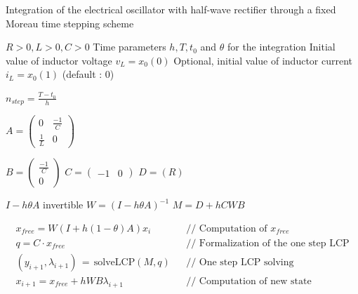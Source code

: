 \documentclass[10pt]{article}
\begin{document}
\begin{algorithm}
\caption{Integration of the electrical oscillator with half-wave rectifier through a fixed Moreau time stepping scheme}
\begin{algorithmic} 

\REQUIRE $R > 0 , L > 0 , C > 0$
\REQUIRE Time parameters $h,T,t_0$ and $\theta$ for the integration 
\REQUIRE Initial value of inductor voltage $v_L = x_0(0)$
\REQUIRE Optional, initial value  of inductor current $i_L = x_0(1)$ (default : 0)

\STATE $n_{step} = \frac{T - t_0}{h}$

\STATE $A = \left( \begin{array}{cc}
0 & \frac{-1}{C}\\
\frac{1}{L} & 0
\end{array} \right)$

\STATE $B = \left( \begin{array}{c}
\frac{-1}{C}\\
 0
\end{array} \right)$
\STATE $C = \left( \begin{array}{cc}
-1 & 0
\end{array} \right)$
\STATE $D = (R)$

\REQUIRE $I - h \theta A$ invertible
\STATE $W = (I - h \theta A)^{-1}$
\STATE $M = D + h C W B$

\STATE \begin{eqnarray*} 
x_{free} = W (I + h (1 - \theta) A) x_i && \textrm{// Computation of $x_{free}$} \\
q = C \cdot x_{free} &&  \textrm{// Formalization of the one step LCP} \\
(y_{i+1},\lambda_{i+1})\,=\,\textrm{solveLCP}(M,q) &&  \textrm{// One step LCP solving} \\
x_{i+1} = x_{free} + h W B \lambda_{i+1} &&  \textrm{// Computation of new state}
\end{eqnarray*}
\ENDFOR

\end{algorithmic}
\end{algorithm}
\end{document}
